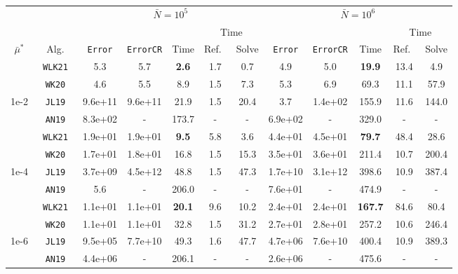 \begin{tabular}{ccccccc|ccccc}%
\toprule
& & \multicolumn{5}{c}{$\bar N = 10^5$} & \multicolumn{5}{c}{$\bar N = 10^6$} \\
\cmidrule(lr){3-7} \cmidrule(lr){8-12}
& & & & & \multicolumn{2}{c}{Time} & & & & \multicolumn{2}{c}{Time} \\
\cmidrule(lr){6-7} \cmidrule(lr){11-12}
$\bar\mu^*$   & Alg.        & \texttt{Error} & \texttt{ErrorCR} & Time      & Ref.\ & Solve & \texttt{Error} & \texttt{ErrorCR} & Time     & Ref.\  & Solve \\
\midrule
& \texttt{ WLK21 }&  5.3&  5.7& \textbf{ 2.6 }&  1.7&  0.7&  4.9&  5.0& \textbf{ 19.9 }&  13.4&  4.9 \\
& \texttt{ WK20 }&  4.6&  5.5&  8.9&  1.5&  7.3&  5.3&  6.9&  69.3&  11.1&  57.9 \\
1e-2& \texttt{ JL19 }&  9.6e+11&  9.6e+11&  21.9&  1.5&  20.4&  3.7&  1.4e+02&  155.9&  11.6&  144.0 \\
& \texttt{ AN19 }&  8.3e+02& -&  173.7& -& -&  6.9e+02& -&  329.0& -& - \\
\midrule
& \texttt{ WLK21 }&  1.9e+01&  1.9e+01& \textbf{ 9.5 }&  5.8&  3.6&  4.4e+01&  4.5e+01& \textbf{ 79.7 }&  48.4&  28.6 \\
& \texttt{ WK20 }&  1.7e+01&  1.8e+01&  16.8&  1.5&  15.3&  3.5e+01&  3.6e+01&  211.4&  10.7&  200.4 \\
1e-4& \texttt{ JL19 }&  3.7e+09&  4.5e+12&  48.8&  1.5&  47.3&  1.7e+10&  3.1e+12&  398.6&  10.9&  387.4 \\
& \texttt{ AN19 }&  5.6& -&  206.0& -& -&  7.6e+01& -&  474.9& -& - \\
\midrule
& \texttt{ WLK21 }&  1.1e+01&  1.1e+01& \textbf{ 20.1 }&  9.6&  10.2&  2.4e+01&  2.4e+01& \textbf{ 167.7 }&  84.6&  80.4 \\
& \texttt{ WK20 }&  1.1e+01&  1.1e+01&  32.8&  1.5&  31.2&  2.7e+01&  2.8e+01&  257.2&  10.6&  246.4 \\
1e-6& \texttt{ JL19 }&  9.5e+05&  7.7e+10&  49.3&  1.6&  47.7&  4.7e+06&  7.6e+10&  400.4&  10.9&  389.3 \\
& \texttt{ AN19 }&  4.4e+06& -&  206.1& -& -&  2.6e+06& -&  475.6& -& - \\
\bottomrule
\end{tabular}
